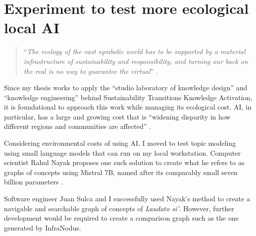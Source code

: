 \section{Experiment to test more ecological local AI}
\begin{quote}
    ``\textit{The ecology of the vast symbolic world has to be supported by a material infrastructure of sustainability and responsibility, and turning our back on the real is no way to guarantee the virtual}” \citep[p. 196]{drucker_graphesis_2014}. 
\end{quote}
Since my thesis works to apply the ``studio laboratory of knowledge design” \citep[p. 197]{drucker_graphesis_2014}  and ``knowledge engineering” \citep[p. 8]{wielinga_kads_1992}  behind Sustainability Transitions Knowledge Activation, it is foundational to approach this work while managing its ecological cost. AI, in particular, has a large and growing cost that is ``widening disparity in how different regions and communities are affected” \citep{ren_uneven_2024}. 
   

Considering environmental costs of using AI, I moved to test topic modeling using small language models that can run on my local workstation. Computer scientist Rahul Nayak proposes one such solution to create what he refers to as graphs of concepts using Mistral 7B, named after its comparably small seven billion parameters \citep{nayak_how_2023}.

Software engineer Juan Sulca and I successfully used Nayak’s method to create a navigable and searchable graph of concepts of \textit{Laudato si’}. However, further development would be required to create a comparison graph such as the one generated by InfraNodus.

